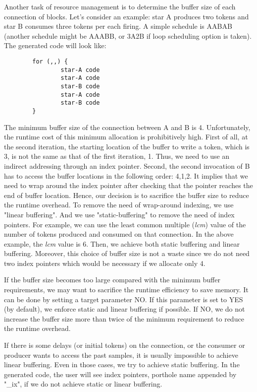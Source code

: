 Another task of resource management is to determine the buffer size of
each connection of blocks.  Let's consider an example: star A produces
two tokens and star B consumes three tokens per each firing. A simple
schedule is AABAB (another schedule might be AAABB, or 3A2B if loop
scheduling option is taken). The generated code will look like:

\begin{verbatim}
        for (,,) {
                star-A code
                star-A code
                star-B code
                star-A code
                star-B code
        }
\end{verbatim}

The minimum buffer size of the connection
between A and B is 4. Unfortunately, the runtime cost of this 
minimum allocation is prohibitively high. First of all, at the second
iteration,
the starting location of the buffer to write a token, which is 3,
is not the same as that of the first iteration, 1. Thus, we need to
use an indirect addressing through an index pointer. Second, the second
invocation of B has to access the buffer locations in the following order:
4,1,2. It implies that we need to wrap around the index pointer after
checking that the pointer reaches the end of buffer location.
Hence, our decision is to sacrifice the buffer size to reduce the runtime
overhead. To remove the need of wrap-around indexing, we use "linear
buffering". And we use "static-buffering" to remove the need of
index pointers. For example, we can use the least common multiple (\emph{lcm})
value of the number of tokens produced and consumed on that connection.
In the above example, the \emph{lcm} value is 6. Then, we achieve both
static buffering and linear buffering. Moreover, this choice of
buffer size is not a waste since we do not need two index pointers which
would be necessary if we allocate only 4.

If the buffer size becomes too large compared with the minimum buffer
requirements, we may want to sacrifice the runtime efficiency to save
memory. It can be done by setting a target parameter
NO. If this parameter is set to YES (by default), we enforce static
and linear buffering if possible. If NO, we do not increase the buffer
size more than twice of the minimum requirement to reduce the runtime
overhead.

If there is some delays (or initial tokens) on the connection, or
the consumer or producer wants to access the past samples, it is
usually impossible to achieve linear buffering. Even in those
cases, we try to achieve static buffering. In the generated code,
the user will see index pointers, porthole name appended by "_ix", if
we do not achieve static or linear buffering.

